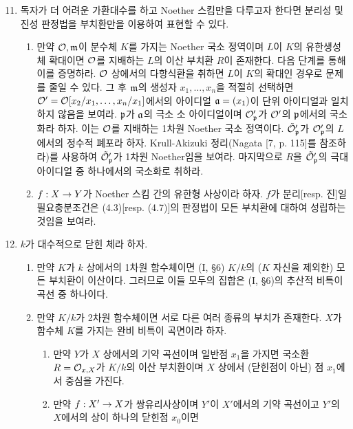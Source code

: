 	\begin{enumerate}[label=\tb{4.\arabic*.},itemindent=0mm,itemsep=4mm]
	\setcounter{enumi}{10}
	\item 독자가 더 어려운 가환대수를 하고 Noether 스킴만을 다루고자 한다면
	분리성 및 진성 판정법을  부치환만을 이용하여 표현할 수 있다.
	\begin{enumerate}[label=(\alph*)]
	\item 만약 $\mathcal{O},\mathfrak{m}$이 분수체 $K$를 가지는 Noether 국소 정역이며 $L$이 $K$의 유한생성 체 확대이면
	$\mathcal{O}$를 지배하는 $L$의 이산 부치환 $R$이 존재한다. 다음 단계를 통해 이를 증명하라.
	$\mathcal{O}$ 상에서의 다항식환을 취하면 $L$이 $K$의  확대인 경우로 문제를 줄일 수 있다.
	그 후 $\mathfrak{m}$의 생성자 $x_1,\ldots,x_n$을 적절히 선택하면
	$\mathcal{O}'=\mathcal{O}[x_2/x_1,\ldots,x_n/x_1]$에서의 아이디얼 $\mathfrak{a}=(x_1)$이 단위 아이디얼과 일치하지 않음을 보여라.
	$\mathfrak{p}$가 $\mathfrak{a}$의 극소 소 아이디얼이며 $\mathcal{O}'_{\mathfrak{p}}$가 $\mathcal{O}'$의 $\mathfrak{p}$에서의 국소화라 하자.
	이는 $\mathcal{O}$를 지배하는 1차원 Noether 국소 정역이다. $\tilde{\mathcal{O}}'_{\mathfrak{p}}$가 $\mathcal{O}'_{\mathfrak{p}}$의 $L$에서의 정수적 폐포라 하자.
	Krull-Akizuki 정리(Nagata [7, p. 115]를 참조하라)를 사용하여 $\tilde{\mathcal{O}}'_{\mathfrak{p}}$가 1차원 Noether임을 보여라.
	마지막으로 $R$을 $\tilde{\mathcal{O}}'_{\mathfrak{p}}$의 극대 아이디얼 중 하나에서의 국소화로 취하라.
	\item $f:X\rightarrow Y$가 Noether 스킴 간의 유한형 사상이라 하자. $f$가 분리[resp. 진]일 필요충분조건은
	(4.3)[resp. (4.7)]의 판정법이 모든  부치환에 대하여 성립하는 것임을 보여라.
	\end{enumerate}
	\sol
	\item {} $k$가 대수적으로 닫힌 체라 하자.
	\begin{enumerate}[label=(\alph*)]
	\item 만약 $K$가 $k$ 상에서의 1차원 함수체이면 (I, \S 6) $K/k$의 ($K$ 자신을 제외한) 모든 부치환이 이산이다.
	그러므로 이들 모두의 집합은 (I, \S 6)의 추산적 비특이 곡선 중 하나이다.
	\item 만약 $K/k$가 2차원 함수체이면 서로 다른 여러 종류의 부치가 존재한다. $X$가 함수체 $K$를 가지는 완비 비특이 곡면이라 하자.
	\begin{enumerate}[label=(\arabic*)]
	\item 만약 $Y$가 $X$ 상에서의 기약 곡선이며 일반점 $x_1$을 가지면 국소환 $R=\mathcal{O}_{x,X}$가 $K/k$의 이산 부치환이며
	$X$ 상에서 (닫힌점이 아닌) 점 $x_1$에서 중심을 가진다.
	\item 만약 $f:X'\rightarrow X$가 쌍유리사상이며 $Y'$이 $X'$에서의 기약 곡선이고 $Y'$의 $X$에서의 상이 하나의 닫힌점 $x_0$이면

\end{enumerate}
\end{enumerate}
\end{enumerate}
